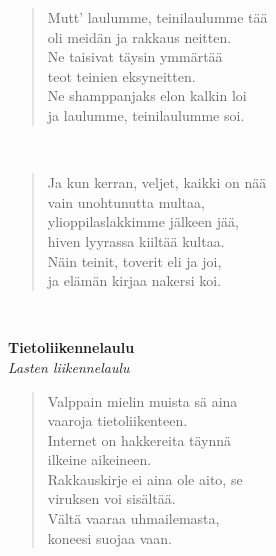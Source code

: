 \noindent\begin{minipage}{\linewidth}
\begin{verse}
	Mutt' laulumme, teinilaulumme tää\\
	oli meidän ja rakkaus neitten.\\
	Ne taisivat täysin ymmärtää\\
	teot teinien eksyneitten.\\
	Ne shamppanjaks elon kalkin loi\\
	ja laulumme, teinilaulumme soi.\\
\end{verse}
\end{minipage}\\[10pt]
\noindent\begin{minipage}{\linewidth}
\begin{verse}
	Ja kun kerran, veljet, kaikki on nää\\
	vain unohtunutta multaa,\\
	ylioppilaslakkimme jälkeen jää,\\
	hiven lyyrassa kiiltää kultaa.\\
	Näin teinit, toverit eli ja joi,\\
	ja elämän kirjaa nakersi koi.\\
\end{verse}
\end{minipage}\\[10pt]
%
%
\noindent\begin{minipage}{\linewidth}
\vspace{5pt}
\parbox[t]{0.85\linewidth}{\raggedright {\large\bf Tietoliikennelaulu}\\[2pt]\small\emph{Lasten liikennelaulu}\\[6pt]}
\begin{verse}
	
	Valppain mielin muista sä aina\\
	vaaroja tietoliikenteen.\\
	Internet on hakkereita täynnä\\
	ilkeine aikeineen.\\
	Rakkauskirje ei aina ole aito, se\\
	viruksen voi sisältää.\\
	Vältä vaaraa uhmailemasta,\\
	koneesi suojaa vaan.\\
\end{verse}
\end{minipage}\\[10pt]
